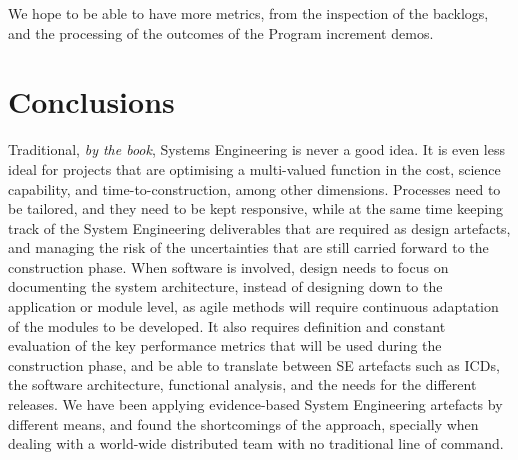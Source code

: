 \documentclass[11pt,twoside]{article}
\begin{document}
We hope to be able to have more metrics, from the inspection of the backlogs, and the processing of the outcomes of the Program increment demos.	



\section{Conclusions} %
\label{sec:conclusions}
Traditional, \emph{by the book}, Systems Engineering is never a good idea. It is even less ideal for projects that are optimising a multi-valued function in the cost, science capability, and time-to-construction, among other dimensions. Processes need to be tailored, and they need to be kept responsive, while at the same time keeping track of the System Engineering deliverables that are required as design artefacts, and managing the risk of the uncertainties that are still carried forward to the construction phase.
When software is involved, design needs to focus on documenting the system architecture, instead of designing down to the application or module level, as agile methods will require continuous adaptation of the modules to be developed. 
It also requires definition and constant evaluation of the key performance metrics that will be used during the construction phase, and be able to translate between SE artefacts such as ICDs, the software architecture, functional analysis, and the needs for the different releases.	
We have been applying evidence-based System Engineering artefacts by different means, and found the shortcomings of the approach, specially when dealing with a world-wide distributed team with no traditional line of command.




\end{document}
